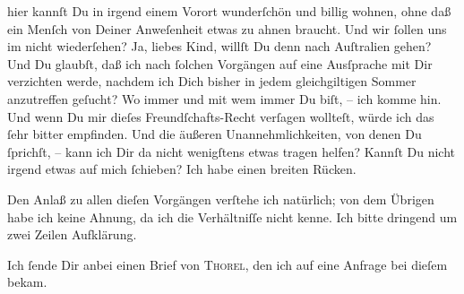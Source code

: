                hier kannſt Du in irgend einem Vorort wunderſchön und billig wohnen, ohne daß ein
               Menſch von Deiner Anweſenheit etwas zu ahnen braucht. Und wir ſollen uns im \label{K_L02802-3v}\label{K_L02802-3} nicht wiederſehen? Ja,
               liebes Kind, willſt Du denn nach Auſtralien
               gehen? Und Du glaubſt, daß ich {\pb}nach ſolchen
               Vorgängen auf eine Ausſprache mit Dir verzichten werde, nachdem ich Dich bisher in
               jedem gleichgiltigen Sommer anzutreffen geſucht? Wo immer und mit wem immer Du biſt,
               – ich komme hin. Und wenn Du mir dieſes Freundſchafts-Recht verſagen wollteſt, würde
               ich das ſehr bitter empfinden. Und die äußeren Unannehmlichkeiten, von denen Du
               ſprichſt, – kann ich Dir da nicht wenigſtens etwas tragen helfen? Kannſt Du nicht
               irgend etwas auf mich ſchieben? Ich habe einen breiten Rücken.\pend
           
\pstart
           {\pb}Den Anlaß zu allen dieſen Vorgängen verſtehe ich
               natürlich; von dem Übrigen habe ich keine Ahnung, da ich die Verhältniſſe nicht
               kenne. Ich bitte dringend um zwei Zeilen Aufklärung.\pend
           
\pstart
           Ich ſende Dir anbei einen Brief von \textsc{Thorel}, den ich auf eine Anfrage bei dieſem bekam.\pend
           
